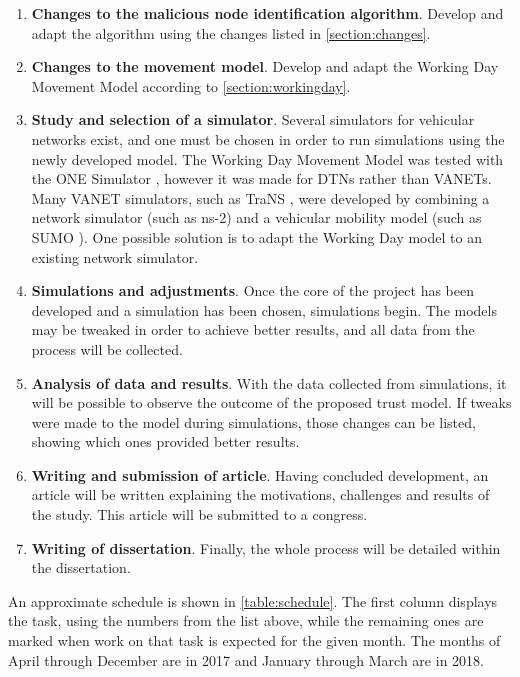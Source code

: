 \begin{enumerate}
	\item \textbf{Changes to the malicious node identification algorithm}. Develop and adapt the algorithm using the changes listed in \autoref{section:changes}.
	\item \textbf{Changes to the movement model}. Develop and adapt the Working Day Movement Model according to \autoref{section:workingday}.
	\item \textbf{Study and selection of a simulator}. Several simulators for vehicular networks exist, and one must be chosen in order to run simulations using the newly developed model. The Working Day Movement Model was tested with the ONE Simulator \cite{keranen2009one}, however it was made for DTNs rather than VANETs. Many VANET simulators, such as TraNS \cite{piorkowski2008trans}, were developed by combining a network simulator (such as ns-2) and a vehicular mobility model (such as SUMO \cite{behrisch2011sumo}). One possible solution is to adapt the Working Day model to an existing network simulator.
	\item \textbf{Simulations and adjustments}. Once the core of the project has been developed and a simulation has been chosen, simulations begin. The models may be tweaked in order to achieve better results, and all data from the process will be collected.
	\item \textbf{Analysis of data and results}. With the data collected from simulations, it will be possible to observe the outcome of the proposed trust model. If tweaks were made to the model during simulations, those changes can be listed, showing which ones provided better results.
	\item \textbf{Writing and submission of article}. Having concluded development, an article will be written explaining the motivations, challenges and results of the study. This article will be submitted to a congress.
	\item \textbf{Writing of dissertation}. Finally, the whole process will be detailed within the dissertation.
\end{enumerate}

An approximate schedule is shown in \autoref{table:schedule}.
The first column displays the task, using the numbers from the list above, while the remaining ones are marked when work on that task is expected for the given month.
The months of April through December are in 2017 and January through March are in 2018.

